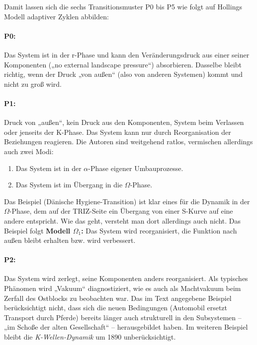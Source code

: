 \documentclass[11pt,a4paper]{article}
\begin{document}
Damit lassen sich die sechs Transitionsmuster P0 bis P5 wie folgt auf Hollings
Modell adaptiver Zyklen abbilden:

\paragraph{P0:}
Das System ist in der r-Phase und kann den Veränderungsdruck aus einer seiner
Komponenten („no external landscape pressure“) absorbieren. Dasselbe bleibt
richtig, wenn der Druck „von außen“ (also von anderen Systemen) kommt und
nicht zu groß wird.

\paragraph{P1:}
Druck von „außen“, kein Druck aus den Komponenten, System beim Verlassen oder
jenseits der K-Phase. Das System kann nur durch Reorganisation der Beziehungen
reagieren. Die Autoren sind weitgehend ratlos, vermischen allerdings auch zwei
Modi:
\begin{enumerate}[noitemsep]
\item Das System ist in der $\alpha$-Phase eigener Umbauprozesse.
\item Das System ist im Übergang in die $\Omega$-Phase.
\end{enumerate}

Das Beispiel (Dänische Hygiene-Transition) ist klar eines für die Dynamik in
der $\Omega$-Phase, dem auf der TRIZ-Seite ein Übergang von einer S-Kurve auf
eine andere entspricht. Wie das geht, versteht man dort allerdings auch
nicht. Das Beispiel folgt \textbf{Modell $\Omega_1$:} Das System wird
reorganisiert, die Funktion nach außen bleibt erhalten bzw. wird verbessert.

\paragraph{P2:}
Das System wird zerlegt, seine Komponenten anders reorganisiert. Als typisches
Phänomen wird „Vakuum“ diagnostiziert, wie es auch als Machtvakuum beim
Zerfall des Ostblocks zu beobachten war. Das im Text angegebene Beispiel
berücksichtigt nicht, dass sich die neuen Bedingungen (Automobil ersetzt
Transport durch Pferde) bereits länger auch strukturell in den Subsystemen --
„im Schoße der alten Gesellschaft“ -- herausgebildet haben. Im weiteren
Beispiel bleibt die \emph{K-Wellen-Dynamik} um 1890 unberücksichtigt.
\end{document}
